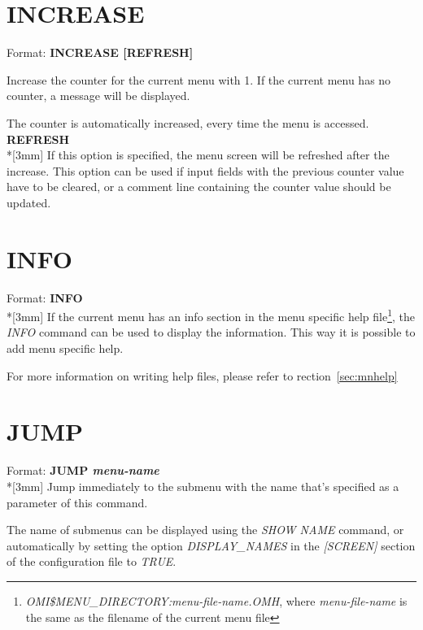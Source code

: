 \documentclass[a4paper]{book}
\renewcommand{\indent}{\hspace*{5mm}}
\begin{document}
\section{INCREASE}
\label{subsec:increase}

\indent Format: \textbf{INCREASE [REFRESH]}

\noindent Increase the counter for the current menu with 1. If the current menu has no 
counter, a message will be displayed.

The counter is automatically increased, every time the menu is accessed.\\[3mm]
\textbf{REFRESH}\\*[3mm]
If this option is specified, the menu screen will be refreshed after the 
increase. This option can be used if input fields with the previous counter 
value have to be cleared, or a comment line containing the counter value 
should be updated.

\section{INFO}
\label{subsec:cmdinfo}

\indent Format: \textbf{INFO}\dag\\*[3mm]
If the current menu has an info section in the menu specific help
file\footnote{ \textsl{OMI\$MENU\_DIRECTORY:\textit{menu-file-name}.OMH}, 
where \textit{menu-file-name} is the same as the filename of the current menu file}, the
\textsl{INFO} command can be used to display the information. This way it is possible to add menu specific help.

For more information on writing help files, please refer to rection~\ref{sec:mnhelp}

\section{JUMP}
\label{subsec:mylabel16}

\indent Format: \textbf{JUMP \textit{menu-name}}\dag\\*[3mm]
Jump immediately to the submenu with the name that's specified as a 
parameter of this command.

The name of submenus can be displayed using the
\textsl{SHOW NAME}
command, or automatically by setting the option \textsl{DISPLAY{\_}NAMES} in the
\textsl{[SCREEN]}
section of the configuration file to \textsl{TRUE}.
\end{document}
